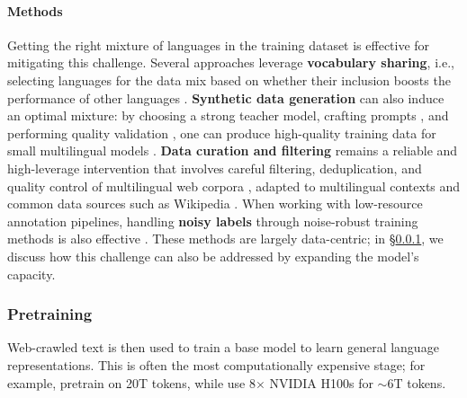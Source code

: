 \documentclass[11pt,a4paper]{article}
\begin{document}
\paragraph{Methods}
Getting the right mixture of languages in the training dataset is effective for mitigating this challenge.
Several approaches leverage \textbf{vocabulary sharing}, i.e.,  selecting languages for the data mix based on whether their inclusion boosts the performance of other languages \citep[\textit{inter alia}]{yuan-etal-2024-vocabulary,li2025rethinking}.
\textbf{Synthetic data generation} can also induce an optimal mixture:
by choosing a strong teacher model,%
crafting prompts \citep{mora2025artaskingmultilingualprompt},
and performing quality validation \citep{anugraha2026mr3multilingualrubricagnosticreward,pombal2025mprometheus},
one can produce high-quality training data for small multilingual models \citep{devine2026kakugodistillationlowresourcelanguages,kim2026dataefficientpretrainingscalingsynthetic}.
\textbf{Data curation and filtering} remains a reliable and high-leverage intervention that involves careful filtering, deduplication, and quality control of multilingual web corpora \citep{kuduguntua-etal-2023-madlad400,langlais2026common,datologyai2026uberwebinsightsmultilingualcuration},
adapted to multilingual contexts \citep{ali-etal-2025-judging,shen2025dcad} and common data sources such as Wikipedia \citep{lignos-etal-2022-toward}.
When working with low-resource annotation pipelines, handling \textbf{noisy labels} through noise-robust training methods is also effective \citep{jin-etal-2021-instance,wang-etal-2023-noise,wu-etal-2023-noisywikihow}.
These methods are largely data-centric; in \S\ref{sec:pretraining}, we discuss how this challenge can also be addressed by expanding the model's capacity.


\subsubsection{Pretraining}
\label{sec:pretraining}

Web-crawled text is then used to train a base model to learn general language representations.
This is often the most computationally expensive stage;
for example, \citet{nvidia2025nvidianemotronnano2} pretrain on 20T tokens, while \citet{olmo2025olmo3} use 8$\times$ NVIDIA H100s for $\sim$6T tokens.
\end{document}
